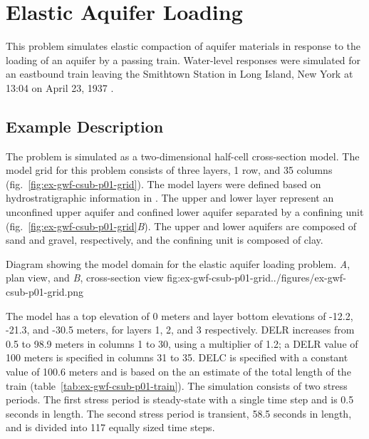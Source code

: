 \section{Elastic Aquifer Loading}
This problem simulates elastic compaction of aquifer materials in response to the loading of an aquifer by a passing train. Water-level responses were simulated for an eastbound train leaving the Smithtown Station in Long Island, New York at 13:04 on April 23, 1937 \citep{jacob1939fluctuations}. 

\subsection{Example Description}

The problem is simulated as a two-dimensional half-cell cross-section model. The model grid for this problem consists of three layers, 1 row, and 35 columns (fig.~\ref{fig:ex-gwf-csub-p01-grid}). The model layers were defined based on hydrostratigraphic information in \cite{jacob1939fluctuations}. The upper and lower layer represent an unconfined upper aquifer and confined lower aquifer separated by a confining unit (fig.~\ref{fig:ex-gwf-csub-p01-grid}\textit{B}). The upper and lower aquifers are composed of sand and gravel, respectively, and the confining unit is composed of clay. 

\begin{StandardFigure}{
                                     Diagram showing the model domain for the elastic aquifer 
                                     loading problem. \textit{A}, plan view, and \textit{B}, cross-section view
                                     }{fig:ex-gwf-csub-p01-grid}{../figures/ex-gwf-csub-p01-grid.png}
\end{StandardFigure}                                 


The model has a top elevation of 0 meters and layer bottom elevations of -12.2, -21.3, and -30.5 meters, for layers 1, 2, and 3 respectively.  DELR increases from 0.5 to 98.9 meters  in columns 1 to 30, using a multiplier of 1.2; a DELR value of 100 meters is specified in columns 31 to 35. DELC is specified with a constant value of 100.6 meters and is based on the an estimate of the total length of the train (table~\ref{tab:ex-gwf-csub-p01-train}). The simulation consists of two stress periods. The first stress period is steady-state with a single time step and is 0.5 seconds in length. The second stress period is transient, 58.5 seconds in length, and is divided into 117 equally sized time steps. 


